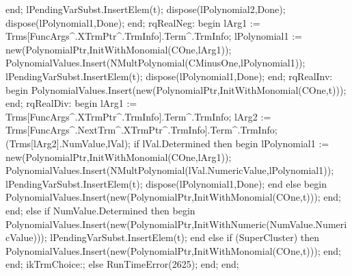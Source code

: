                               end;
                              lPendingVarSubst.InsertElem(t);
                              dispose(lPolynomial2,Done);
                              dispose(lPolynomial1,Done);
                           end;
                        rqRealNeg:
                           begin
                              lArg1 := Trms[FuncArgs^.XTrmPtr^.TrmInfo].Term^.TrmInfo;
                              lPolynomial1 := new(PolynomialPtr,InitWithMonomial(COne,lArg1));
                              PolynomialValues.Insert(NMultPolynomial(CMinusOne,lPolynomial1));
                              lPendingVarSubst.InsertElem(t);
                              dispose(lPolynomial1,Done);
                           end;
                        rqRealInv:
                           begin
                              PolynomialValues.Insert(new(PolynomialPtr,InitWithMonomial(COne,t)));
                           end;
                        rqRealDiv:
                           begin
                              lArg1 := Trms[FuncArgs^.XTrmPtr^.TrmInfo].Term^.TrmInfo;
                              lArg2 := Trms[FuncArgs^.NextTrm^.XTrmPtr^.TrmInfo].Term^.TrmInfo;
                              (Trms[lArg2].NumValue,lVal);
                              if lVal.Determined then
                              begin
                                 lPolynomial1 := new(PolynomialPtr,InitWithMonomial(COne,lArg1));
                                 PolynomialValues.Insert(NMultPolynomial(lVal.NumericValue,lPolynomial1));
                                 lPendingVarSubst.InsertElem(t);
                                 dispose(lPolynomial1,Done);
                              end
                              else
                              begin
                                 PolynomialValues.Insert(new(PolynomialPtr,InitWithMonomial(COne,t)));
                              end;
                           end;
                     else if NumValue.Determined then
                     begin
                        PolynomialValues.Insert(new(PolynomialPtr,InitWithNumeric(NumValue.NumericValue)));
                        lPendingVarSubst.InsertElem(t);
                     end
                     else if (SuperCluster) then
                        PolynomialValues.Insert(new(PolynomialPtr,InitWithMonomial(COne,t)));
                     end;
                  end;
                  ikTrmChoice:;
               else RunTimeError(2625);
               end;
            end;
